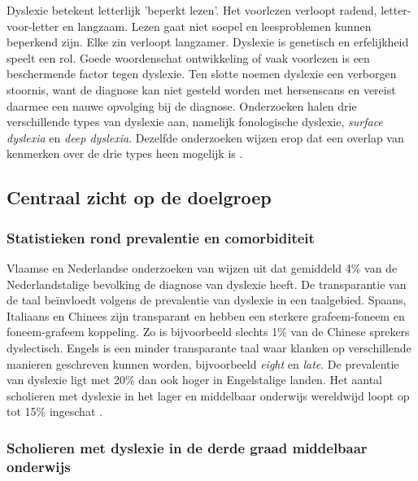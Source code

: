 Dyslexie betekent letterlijk 'beperkt lezen'. Het voorlezen verloopt radend, letter-voor-letter en langzaam. Lezen gaat niet soepel en leesproblemen kunnen beperkend zijn. Elke zin verloopt langzamer. Dyslexie is genetisch en erfelijkheid speelt een rol. Goede woordenschat ontwikkeling of vaak voorlezen is een beschermende factor tegen dyslexie. Ten slotte noemen \textcite{Vellutino2004, Bonte2020} dyslexie een verborgen stoornis, want de diagnose kan niet gesteld worden met hersenscans en vereist daarmee een nauwe opvolging bij de diagnose. Onderzoeken halen drie verschillende types van dyslexie aan, namelijk fonologische dyslexie, \textit{surface dyslexia} en \textit{deep dyslexia}. Dezelfde onderzoeken wijzen erop dat een overlap van kenmerken over de drie types heen mogelijk is \autocite{Rello2012, Vellutino2004}.

\subsection{Centraal zicht op de doelgroep}

\subsubsection{Statistieken rond prevalentie en comorbiditeit}

Vlaamse en Nederlandse onderzoeken van \textcite{Wentink2008, Desoete2017} wijzen uit dat gemiddeld 4\% van de Nederlandstalige bevolking de diagnose van dyslexie heeft. De transparantie van de taal beïnvloedt volgens \textcite{APA2013} de prevalentie van dyslexie in een taalgebied. Spaans, Italiaans en Chinees zijn transparant en hebben een sterkere grafeem-foneem en foneem-grafeem koppeling. Zo is bijvoorbeeld slechts 1\% van de Chinese sprekers dyslectisch. Engels is een minder transparante taal waar 
klanken op verschillende manieren geschreven kunnen worden, bijvoorbeeld \textit{eight} en \textit{late}. De prevalentie van dyslexie ligt met 20\% dan ook hoger in Engelstalige landen. Het aantal scholieren met dyslexie in het lager en middelbaar onderwijs wereldwijd loopt op tot 15\% ingeschat \autocite{Bonte2020, VanDerMeer2022}.


\subsubsection{Scholieren met dyslexie in de derde graad middelbaar onderwijs}

